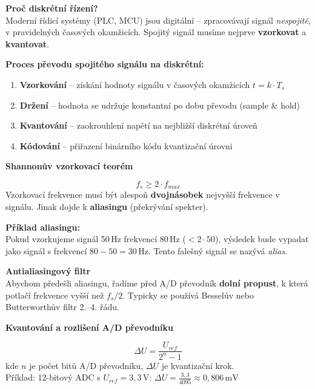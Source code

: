 \documentclass[a4paper,10pt]{article}
\begin{document}
\begin{vysvetlenibox}
\textbf{Proč diskrétní řízení?}\\
Moderní řídicí systémy (PLC, MCU) jsou digitální -- zpracovávají signál
\textit{nespojitě}, v pravidelných časových okamžicích.
Spojitý signál musíme nejprve \textbf{vzorkovat} a \textbf{kvantovat}.

\textbf{Proces převodu spojitého signálu na diskrétní:}
\begin{enumerate}[noitemsep, leftmargin=1.4em, topsep=4pt]
    \item \textbf{Vzorkování} -- získání hodnoty signálu v časových okamžicích $t = k \cdot T_s$
    \item \textbf{Držení} -- hodnota se udržuje konstantní po dobu převodu (sample \& hold)
    \item \textbf{Kvantování} -- zaokrouhlení napětí na nejbližší diskrétní úroveň
    \item \textbf{Kódování} -- přiřazení binárního kódu kvantizační úrovni
\end{enumerate}

\textbf{Shannonův vzorkovací teorém}

\begin{vzorcebox}
$$f_s \geq 2 \cdot f_{max}$$
Vzorkovací frekvence musí být alespoň \textbf{dvojnásobek} nejvyšší
frekvence v signálu. Jinak dojde k \textbf{aliasingu} (překrývání spekter).
\end{vzorcebox}

\textbf{Příklad aliasingu:}\\
Pokud vzorkujeme signál 50\,Hz frekvencí 80\,Hz ($< 2 \cdot 50$),
výsledek bude vypadat jako signál s frekvencí $80 - 50 = 30$\,Hz.
Tento falešný signál se nazývá \textit{alias}.

\textbf{Antialiasingový filtr}\\
Abychom předešli aliasingu, řadíme před A/D převodník \textbf{dolní propust},
k která potlačí frekvence vyšší než $f_s / 2$. Typicky se používá
Besselův nebo Butterworthův filtr 2.--4. řádu.

\textbf{Kvantování a rozlišení A/D převodníku}

\begin{vzorcebox}
$$\Delta U = \frac{U_{ref}}{2^n - 1}$$
kde $n$ je počet bitů A/D převodníku, $\Delta U$ je kvantizační krok.\\
Příklad: 12-bitový ADC s $U_{ref} = 3{,}3\,\text{V}$:
$\Delta U = \frac{3{,}3}{4095} \approx 0{,}806\,\text{mV}$
\end{vzorcebox}


\end{vysvetlenibox}
\end{document}
